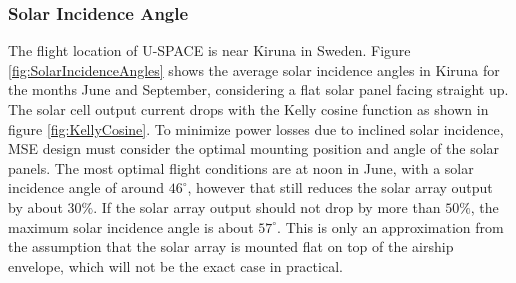 \subsubsection*{Solar Incidence Angle}
The flight location of U-SPACE is near Kiruna in Sweden. Figure \ref{fig:SolarIncidenceAngles} shows the average solar incidence angles in Kiruna for the months June and September\cite{web:solarincidence}, considering a flat solar panel facing straight up.
The solar cell output current drops with the Kelly cosine function as shown in figure \ref{fig:KellyCosine}. To minimize power losses due to inclined solar incidence, \ac{MSE} design must consider the optimal mounting position and angle of the solar panels. The most optimal flight conditions are at noon in June, with a solar incidence angle of around $46^{\circ}$, however that still reduces the solar array output by about $30\%$. If the solar array output should not drop by more than $50\%$, the maximum solar incidence angle is about $57^{\circ}$. This is only an approximation from the assumption that the solar array is mounted flat on top of the airship envelope, which will not be the exact case in practical.
%
